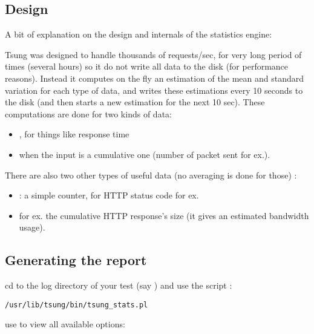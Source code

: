 \documentclass{TSUNG-en}
\begin{document}
\subsection{Design}

A bit of explanation on the design and internals of the statistics engine:

Tsung was designed to handle thousands of requests/sec, for very
long period of times (several hours) so it do not write all data to
the disk (for performance reasons). Instead it computes on the fly an
estimation of the mean and standard variation for each type of data,
and writes these estimations every 10 seconds to the disk (and then
starts a new estimation for the next 10 sec). These computations are
done for two kinds of data:
\begin{itemize}
\item {}, for things like response time
\item {} when the input is a cumulative one (number of
packet sent for ex.).
\end{itemize}

There are also two other types of useful data (no averaging is done for
those) :
\begin{itemize}
\item {}: a simple counter, for HTTP status code for ex.
\item {} for ex. the cumulative HTTP response's size (it gives an
estimated bandwidth usage).
\end{itemize}



\subsection{Generating the report}

cd to the log directory of your test (say
) and use the script
:

\begin{Verbatim}
/usr/lib/tsung/bin/tsung_stats.pl
\end{Verbatim}


use  to view all available options:
\end{document}
